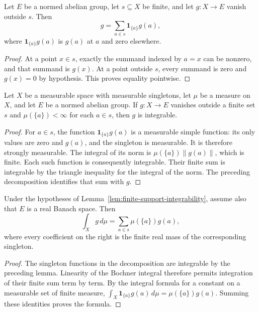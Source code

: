 \begin{lemma}
\label{lem:finite-support-indicators}
\leanok
{}
Let $E$ be a normed abelian group, let $s\subseteq X$ be finite, and
let $g:X\to E$ vanish outside $s$. Then
\[
 g=\sum_{a\in s}\mathbf1_{\{a\}}g(a),
\]
where $\mathbf1_{\{a\}}g(a)$ is $g(a)$ at $a$ and zero elsewhere.
\end{lemma}
\begin{proof}
At a point $x\in s$, exactly the summand indexed by $a=x$ can be
nonzero, and that summand is $g(x)$. At a point outside $s$, every
summand is zero and $g(x)=0$ by hypothesis. This proves equality
pointwise.
\end{proof}

\begin{lemma}
\label{lem:finite-support-integrability}
\leanok
{}
Let $X$ be a measurable space with measurable singletons, let $\mu$
be a measure on $X$, and let $E$ be a normed abelian group.
If $g:X\to E$ vanishes outside a finite set $s$ and
$\mu(\{a\})<\infty$ for each $a\in s$, then $g$ is integrable.
\end{lemma}
\begin{proof}
For $a\in s$, the function $\mathbf1_{\{a\}}g(a)$ is a measurable
simple function: its only values are zero and $g(a)$, and the
singleton is measurable. It is therefore strongly measurable.
The integral of its norm is
$\mu(\{a\})\lVert g(a)\rVert$, which is finite. Each such function
is consequently integrable. Their finite sum is integrable by the
triangle inequality for the integral of the norm. The preceding
decomposition identifies that sum with $g$.
\end{proof}

\begin{lemma}
\label{lem:finite-support-integral}
\leanok
{}
Under the hypotheses of Lemma~\ref{lem:finite-support-integrability},
assume also that $E$ is a real Banach space. Then
\[
 \int_X g\,d\mu=\sum_{a\in s}\mu(\{a\})g(a),
\]
where every coefficient on the right is the finite real mass of the
corresponding singleton.
\end{lemma}
\begin{proof}
The singleton functions in the decomposition are integrable by the
preceding lemma. Linearity of the Bochner integral therefore permits
integration of their finite sum term by term. By the integral formula
for a constant on a measurable set of finite measure,
$\int_X\mathbf1_{\{a\}}g(a)\,d\mu=\mu(\{a\})g(a)$.
Summing these identities proves the formula.
\end{proof}

